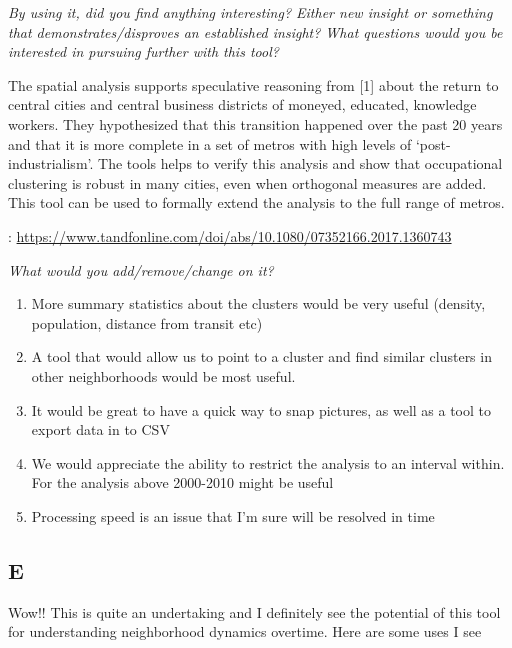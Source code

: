 \documentclass[a4paper]{article}
\newcommand{\question}[1]{\smallskip\noindent\emph{#1}}
\newcommand{\censure}[1]{}
\begin{document}
 

\question{By using it, did you find anything interesting? Either new insight or
 something that demonstrates/disproves an established insight? What questions
 would you be interested in pursuing further with this tool? }

 
The spatial analysis  supports speculative reasoning from [1] about the return
to central cities and central business districts of moneyed, educated, knowledge
workers. They hypothesized that this transition happened over the past 20 years
and  that it is more complete in a set of metros with high levels of
‘post-industrialism’. The tools helps to verify this analysis and show that
occupational clustering is robust in many cities, even when orthogonal measures
are added.  This tool can be used to formally extend the analysis to the full
range of metros.


\noindent [1]: \href{https://www.tandfonline.com/doi/abs/10.1080/07352166.2017.1360743}{\url{https://www.tandfonline.com/doi/abs/10.1080/07352166.2017.1360743}}


\question{What would you add/remove/change on it?}
\begin{enumerate}
  \item{More summary statistics about the clusters would be very useful (density,
  population, distance from transit etc)}
  \item{A tool that would allow us to  point to a cluster and find similar clusters in
  other neighborhoods would be most useful.}
  \item{It would be great to have a quick way to snap pictures, as well as a
  tool to export data in to CSV}
  \item{We would appreciate the ability to restrict the analysis to an interval
  within. For the analysis above 2000-2010 might be useful}
  \item{Processing speed is an issue that I'm sure will be resolved in time}
\end{enumerate}



\subsection{E\censure{ - James Murdoch}}
\censure{\emph{Policy Analyst at 2M Research, USA}}

Wow!! This is quite an undertaking and I definitely see the potential of this
tool for understanding neighborhood dynamics overtime. Here are some uses I see
\end{document}
